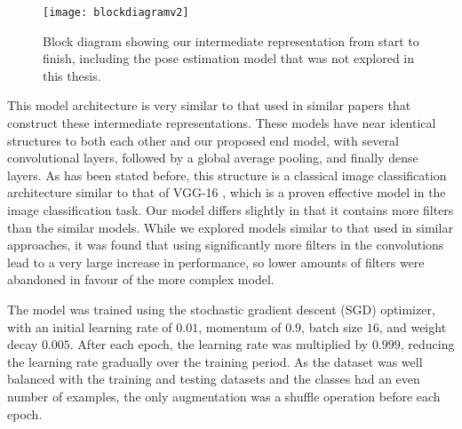 \begin{figure}[ht]
	\texttt{[image: blockdiagramv2]}
	\centering
	\caption{Block diagram showing our intermediate representation from start to finish, including the pose estimation model that was not explored in this thesis.}
	\label{fig:block-diagram}
\end{figure}

This model architecture is very similar to that used in similar papers that construct these intermediate representations. These models have near identical structures to both each other and our proposed end model, with several convolutional layers, followed by a global average pooling, and finally dense layers. As has been stated before, this structure is a classical image classification architecture similar to that of VGG-16 \cite{vgg16}, which is a proven effective model in the image classification task. Our model differs slightly in that it contains more filters than the similar models. While we explored models similar to that used in similar approaches, it was found that using significantly more filters in the convolutions lead to a very large increase in performance, so lower amounts of filters were abandoned in favour of the more complex model.

The model was trained using the stochastic gradient descent (SGD) optimizer, with an initial learning rate of $0.01$, momentum of $0.9$, batch size $16$, and weight decay $0.005$. After each epoch, the learning rate was multiplied by $0.999$, reducing the learning rate gradually over the training period. As the dataset was well balanced with the training and testing datasets and the classes had an even number of examples, the only augmentation was a shuffle operation before each epoch.